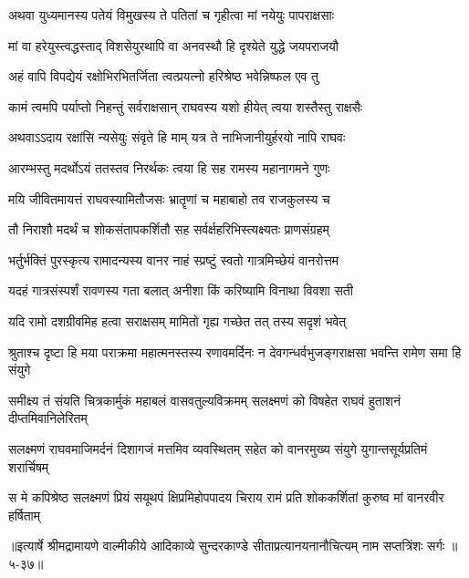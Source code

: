 \twolineshloka
{अथवा युध्यमानस्य पतेयं विमुखस्य ते}
{पतितां च गृहीत्वा मां नयेयुः पापराक्षसाः} %

\twolineshloka
{मां वा हरेयुस्त्वद्धस्ताद् विशसेयुरथापि वा}
{अनवस्थौ हि दृश्येते युद्धे जयपराजयौ} %

\twolineshloka
{अहं वापि विपद्येयं रक्षोभिरभितर्जिता}
{त्वत्प्रयत्नो हरिश्रेष्ठ भवेन्निष्फल एव तु} %

\twolineshloka
{कामं त्वमपि पर्याप्तो निहन्तुं सर्वराक्षसान्}
{राघवस्य यशो हीयेत् त्वया शस्तैस्तु राक्षसैः} %

\twolineshloka
{अथवाऽऽदाय रक्षांसि न्यसेयुः संवृते हि माम्}
{यत्र ते नाभिजानीयुर्हरयो नापि राघवः} %

\twolineshloka
{आरम्भस्तु मदर्थोऽयं ततस्तव निरर्थकः}
{त्वया हि सह रामस्य महानागमने गुणः} %

\twolineshloka
{मयि जीवितमायत्तं राघवस्यामितौजसः}
{भ्रातॄणां च महाबाहो तव राजकुलस्य च} %

\twolineshloka
{तौ निराशौ मदर्थं च शोकसंतापकर्शितौ}
{सह सर्वर्क्षहरिभिस्त्यक्ष्यतः प्राणसंग्रहम्} %

\twolineshloka
{भर्तुर्भक्तिं पुरस्कृत्य रामादन्यस्य वानर}
{नाहं स्प्रष्टुं स्वतो गात्रमिच्छेयं वानरोत्तम} %

\twolineshloka
{यदहं गात्रसंस्पर्शं रावणस्य गता बलात्}
{अनीशा किं करिष्यामि विनाथा विवशा सती} %

\twolineshloka
{यदि रामो दशग्रीवमिह हत्वा सराक्षसम्}
{मामितो गृह्य गच्छेत तत् तस्य सदृशं भवेत्} %

\twolineshloka
{श्रुताश्च दृष्टा हि मया पराक्रमा महात्मनस्तस्य रणावमर्दिनः}
{न देवगन्धर्वभुजङ्गराक्षसा भवन्ति रामेण समा हि संयुगे} %

\twolineshloka
{समीक्ष्य तं संयति चित्रकार्मुकं महाबलं वासवतुल्यविक्रमम्}
{सलक्ष्मणं को विषहेत राघवं हुताशनं दीप्तमिवानिलेरितम्} %

\twolineshloka
{सलक्ष्मणं राघवमाजिमर्दनं दिशागजं मत्तमिव व्यवस्थितम्}
{सहेत को वानरमुख्य संयुगे युगान्तसूर्यप्रतिमं शरार्चिषम्} %

\twolineshloka
{स मे कपिश्रेष्ठ सलक्ष्मणं प्रियं सयूथपं क्षिप्रमिहोपपादय}
{चिराय रामं प्रति शोककर्शितां कुरुष्व मां वानरवीर हर्षिताम्} %


॥इत्यार्षे श्रीमद्रामायणे वाल्मीकीये आदिकाव्ये सुन्दरकाण्डे सीताप्रत्यानयनानौचित्यम् नाम सप्तत्रिंशः सर्गः ॥५-३७॥
